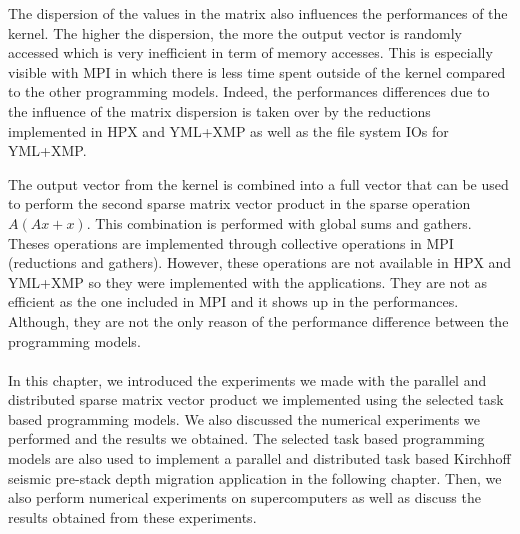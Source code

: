 The dispersion of the values in the matrix also influences the performances of the kernel.
The higher the dispersion, the more the output vector is randomly accessed which is very inefficient in term of memory accesses.
This is especially visible with MPI in which there is less time spent outside of the kernel compared to the other programming models.
Indeed, the performances differences due to the influence of the matrix dispersion is taken over by the reductions implemented in HPX and YML+XMP as well as the file system IOs for YML+XMP.

The output vector from the kernel is combined into a full vector that can be used to perform the second sparse matrix vector product in the sparse operation $A(Ax+x)$.
This combination is performed with global sums and gathers.
Theses operations are implemented through collective operations in MPI (reductions and gathers).
However, these operations are not available in HPX and YML+XMP so they were implemented with the applications.
They are not as efficient as the one included in MPI and it shows up in the performances.
Although, they are not the only reason of the performance difference between the programming models.


\paragraph{}
In this chapter, we introduced the experiments we made with the parallel and distributed sparse matrix vector product we implemented using the selected task based programming models.
We also discussed the numerical experiments we performed and the results we obtained.
The selected task based programming models are also used to implement a parallel and distributed task based Kirchhoff seismic pre-stack depth migration application in the following chapter.
Then, we also perform numerical experiments on supercomputers as well as discuss the results obtained from these experiments.
